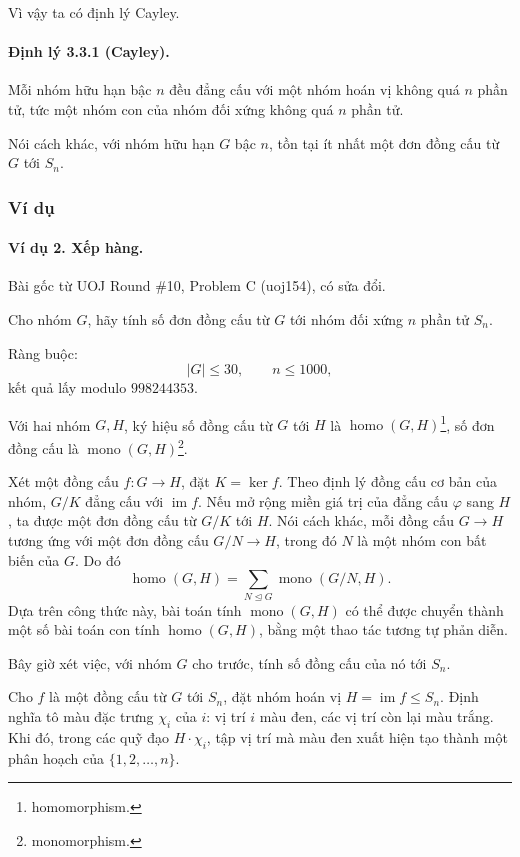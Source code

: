\documentclass[11pt]{article}
\begin{document}
Vì vậy ta có định lý Cayley.

\paragraph{Định lý 3.3.1 (Cayley).}
Mỗi nhóm hữu hạn bậc \(n\) đều đẳng cấu với một nhóm hoán vị không quá \(n\)
phần tử, tức một nhóm con của nhóm đối xứng không quá \(n\) phần tử.

Nói cách khác, với nhóm hữu hạn \(G\) bậc \(n\), tồn tại ít nhất một đơn đồng
cấu từ \(G\) tới \(S_n\).

\subsubsection{Ví dụ}

\paragraph{Ví dụ 2. Xếp hàng.}
Bài gốc từ UOJ Round \#10, Problem C (uoj154), có sửa đổi.

Cho nhóm \(G\), hãy tính số đơn đồng cấu từ \(G\) tới nhóm đối xứng \(n\) phần
tử \(S_n\).

Ràng buộc:
\[
  |G|\le 30,\qquad n\le 1000,
\]
kết quả lấy modulo \(998244353\).

Với hai nhóm \(G,H\), ký hiệu số đồng cấu từ \(G\) tới \(H\) là
\(\operatorname{homo}(G,H)\)\footnote{homomorphism.}, số đơn đồng cấu là
\(\operatorname{mono}(G,H)\)\footnote{monomorphism.}.

Xét một đồng cấu \(f:G\to H\), đặt \(K=\ker f\). Theo định lý đồng cấu cơ bản
của nhóm, \(G/K\) đẳng cấu với \(\operatorname{im} f\). Nếu mở rộng miền giá trị
của đẳng cấu \(\varphi\) sang \(H\), ta được một đơn đồng cấu từ \(G/K\) tới
\(H\). Nói cách khác, mỗi đồng cấu \(G\to H\) tương ứng với một đơn đồng cấu
\(G/N\to H\), trong đó \(N\) là một nhóm con bất biến của \(G\). Do đó
\[
  \operatorname{homo}(G,H)
  =
  \sum_{N\trianglelefteq G}\operatorname{mono}(G/N,H).
\]
Dựa trên công thức này, bài toán tính \(\operatorname{mono}(G,H)\) có thể được
chuyển thành một số bài toán con tính \(\operatorname{homo}(G,H)\), bằng một
thao tác tương tự phản diễn.

Bây giờ xét việc, với nhóm \(G\) cho trước, tính số đồng cấu của nó tới \(S_n\).

Cho \(f\) là một đồng cấu từ \(G\) tới \(S_n\), đặt nhóm hoán vị
\(H=\operatorname{im} f\le S_n\). Định nghĩa tô màu đặc trưng \(\chi_i\) của
\(i\): vị trí \(i\) màu đen, các vị trí còn lại màu trắng. Khi đó, trong các
quỹ đạo \(H\cdot\chi_i\), tập vị trí mà màu đen xuất hiện tạo thành một phân
hoạch của \(\{1,2,\ldots,n\}\).
\end{document}
